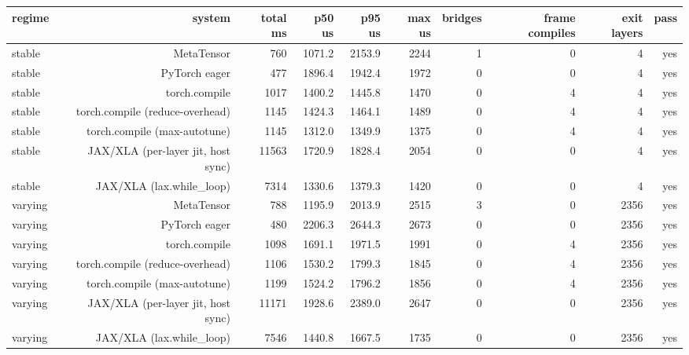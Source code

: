 \begin{tabular}{lrrrrrrrrr}
\toprule
regime & system & total ms & p50 us & p95 us & max us & bridges & frame compiles & exit layers & pass \\
\midrule
stable & MetaTensor & 760 & 1071.2 & 2153.9 & 2244 & 1 & 0 & 4 & yes \\
stable & PyTorch eager & 477 & 1896.4 & 1942.4 & 1972 & 0 & 0 & 4 & yes \\
stable & torch.compile & 1017 & 1400.2 & 1445.8 & 1470 & 0 & 4 & 4 & yes \\
stable & torch.compile (reduce-overhead) & 1145 & 1424.3 & 1464.1 & 1489 & 0 & 4 & 4 & yes \\
stable & torch.compile (max-autotune) & 1145 & 1312.0 & 1349.9 & 1375 & 0 & 4 & 4 & yes \\
stable & JAX/XLA (per-layer jit, host sync) & 11563 & 1720.9 & 1828.4 & 2054 & 0 & 0 & 4 & yes \\
stable & JAX/XLA (lax.while\_loop) & 7314 & 1330.6 & 1379.3 & 1420 & 0 & 0 & 4 & yes \\
varying & MetaTensor & 788 & 1195.9 & 2013.9 & 2515 & 3 & 0 & 2356 & yes \\
varying & PyTorch eager & 480 & 2206.3 & 2644.3 & 2673 & 0 & 0 & 2356 & yes \\
varying & torch.compile & 1098 & 1691.1 & 1971.5 & 1991 & 0 & 4 & 2356 & yes \\
varying & torch.compile (reduce-overhead) & 1106 & 1530.2 & 1799.3 & 1845 & 0 & 4 & 2356 & yes \\
varying & torch.compile (max-autotune) & 1199 & 1524.2 & 1796.2 & 1856 & 0 & 4 & 2356 & yes \\
varying & JAX/XLA (per-layer jit, host sync) & 11171 & 1928.6 & 2389.0 & 2647 & 0 & 0 & 2356 & yes \\
varying & JAX/XLA (lax.while\_loop) & 7546 & 1440.8 & 1667.5 & 1735 & 0 & 0 & 2356 & yes \\
\bottomrule
\end{tabular}

